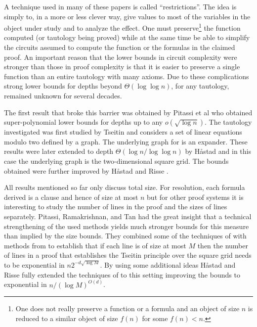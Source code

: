 \documentclass{theoretics}
\begin{document}
A technique used in many of these papers is called ``restrictions''.
The idea is simply to, in a more or less
clever way, give values to most of the
variables in the object under study and to analyze
the effect.  One must preserve\footnote{One does not really
preserve a function or a formula and an object of size $n$ is
reduced to a similar object of size $f(n)$ for some $f(n) < n$.}
the function computed (or tautology being proved) while 
at the same time be able to
simplify the circuits assumed to compute the function or
the formulas in the claimed proof.
An important reason that the lower bounds in circuit complexity
were stronger than those in proof complexity
is that it is easier to preserve a single function
than an entire tautology with many axioms.
Due to these complications strong lower bounds for
depths beyond $\Theta( \log {\log n})$, for any tautology, remained unknown for 
several decades.  

The first result that broke this barrier was 
obtained by Pitassi et al \cite{pitassi16frege}
who obtained super-polynomial lower bounds for
depths up to any $o(\sqrt {\log n})$.
The tautology investigated was first studied by Tseitin \cite{tseitin}
and considers a set of linear equations modulo two defined
by a graph.  The underlying graph for
\cite{pitassi16frege} is an expander.  These results were
later extended to depth $\Theta( \log n / \log {\log n})$
by H{\aa}stad \cite{jhtseitin}
and in this case the underlying graph is the two-dimensional square grid.
The bounds obtained were further improved by 
H{\aa}stad and Risse \cite{jhkr}.

All results mentioned so far only discuss total size.  For
resolution, each formula derived is a clause and hence of size 
at most $n$ but
for other proof systems it is interesting to study
the number of lines in the proof and the sizes of lines
separately.  Pitassi, Ramakrishnan,
and Tan \cite{PRT21} had the great insight that a technical
strengthening of the used methods yields much
stronger bounds for this measure than implied by the
size bounds.  They combined some of the techniques
of \cite{jhtseitin} with methods from \cite{pitassi16frege}
to establish that if each line is of size at most $M$ then
the number of lines in a proof that establishes the Tseitin
principle over the square grid needs to be exponential in $n2^{-d \sqrt {\log M}}$.
By using some additional ideas H{\aa}stad and Risse \cite{jhkr}
fully extended the techniques of \cite{jhtseitin}
to this setting improving the bounds to exponential
in $n/(\log M)^{O(d)}$.
\end{document}
